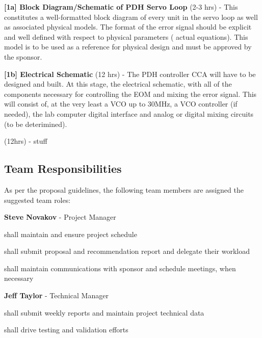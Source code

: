 \begin{packed_itemize}
  \item{\textbf{[1a] Block Diagram/Schematic of PDH Servo Loop} (2-3 hrs)}
  - This constitutes a well-formatted block diagram of every unit in the servo
  loop as well as associated physical models. The format of the error signal
  should be explicit and well defined with respect to physical parameters (
  actual equations). This model is to be used as a reference for physical
  design and must be approved by the sponsor.
  \item{\textbf{[1b] Electrical Schematic} (12 hrs)}
  - The PDH controller CCA will have to be designed and built. At this stage,
  the electrical schematic, with all of the components necessary for controlling
  the EOM and mixing the error signal. This will consist of, at the very least
  a VCO up to 30MHz, a VCO controller (if needed), the lab computer digital
  interface and analog or digital mixing circuits (to be deterimined).
  \item{ (12hrs)}
  - stuff
\end{packed_itemize}

\subsection{Team Responsibilities} %

As per the proposal guidelines, the following team members are assigned the
suggested team roles:
\begin{packed_itemize}
  \item{\textbf{Steve Novakov} - Project Manager}
    \begin{packed_itemize}
      \item shall maintain and ensure project schedule
      \item shall submit proposal and recommendation report and delegate their
      workload
      \item shall maintain communications with sponsor and schedule meetings,
      when necessary
    \end{packed_itemize}
  \item{\textbf{Jeff Taylor} - Technical Manager}
    \begin{packed_itemize}
      \item shall submit weekly reports and maintain project technical data
      \item shall drive testing and validation efforts
    \end{packed_itemize}
\end{packed_itemize}

